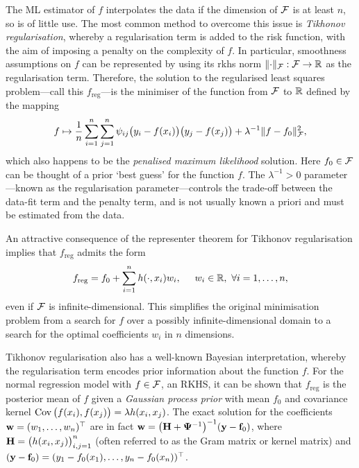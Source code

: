 \documentclass[a4paper,showframe,11pt]{report}
\begin{document}
The ML estimator of $f$ interpolates the data if the dimension of ${\mathcal F}$ is at least $n$, so is of little use.
The most common method to overcome this issue is \emph{Tikhonov regularisation}, whereby a regularisation term is added to the risk function, with the aim of imposing a penalty on the complexity of $f$. 
In particular, smoothness assumptions on $f$ 
can be represented by using its \gls{rkhs} norm $\lVert\cdot\rVert_{\mathcal F}:{\mathcal F} \to \mathbb{R}$ as the regularisation term\footnotemark. 
Therefore, the solution to the regularised least squares problem---call this $f_{\text{reg}}$---is the minimiser of the function from ${\mathcal F}$ to $\mathbb{R}$ defined by the mapping
\begin{align}\label{eq:penfunctional}
  f \mapsto \frac{1}{n}\sum_{i=1}^n \sum_{j=1}^n \psi_{ij} \big(y_i - f(x_i)\big)\big(y_j - f(x_j)\big) + \lambda^{-1} \lVert f-f_0\rVert^2_{\mathcal F},
\end{align}
which also happens to be the \emph{penalised maximum likelihood} solution. 
Here $f_0 \in {\mathcal F}$ can be thought of a prior `best guess' for the function $f$.
The $\lambda^{-1} > 0$ parameter---known as the regularisation parameter---controls the trade-off between the data-fit term and the penalty term, and is not usually known a priori and must be estimated from the data.

An attractive consequence of the representer theorem \citep{kimeldorf1970correspondence} for Tikhonov regularisation implies that $f_\text{reg}$ admits the form
\begin{align}\label{eq:repform}
  f_\text{reg} = f_0 + \sum_{i=1}^n h(\cdot,x_i)w_i, \hspace{0.5cm} w_i \in \mathbb{R}, \ \forall i=1,\dots,n, 
\end{align}
even if ${\mathcal F}$ is infinite-dimensional.
This simplifies the original minimisation problem from a search for $f$ over a possibly infinite-dimensional domain to a search for the optimal coefficients $w_i$ in $n$ dimensions.


Tikhonov regularisation also has a well-known Bayesian interpretation, whereby the regularisation term encodes prior information about the function $f$. 
For the normal regression model with $f \in {\mathcal F}$, an RKHS, it can be shown that $f_{\text{reg}}$ is the posterior mean of $f$ given a \emph{Gaussian process prior} with mean $f_0$ and covariance kernel $\operatorname{Cov}\big(f(x_i),f(x_j)\big) = \lambda h(x_i, x_j)$. 
The exact solution for the coefficients ${\mathbf w} = (w_1,\dots,w_n)^\top$ are in fact ${\mathbf w} = \big({\mathbf H} + {\bm\Psi}^{-1}\big)^{-1}({\mathbf y} - {\mathbf f}_0)$, where ${\mathbf H} = \big(h(x_i,x_j) \big)_{i,j=1}^n$ (often referred to as the Gram matrix or kernel matrix) and $({\mathbf y} - {\mathbf f}_0) = (y_1 - f_0(x_1), \dots, y_n - f_0(x_n))^\top$.
\end{document}
